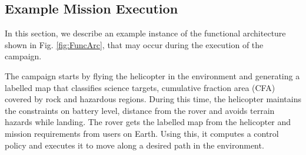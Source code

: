 \documentclass[conference]{IEEEtran}
\begin{document}
	\subsection{Example Mission Execution}
	\label{subsec:ExampleMissionExecution}
	In this section, we describe an example instance of the functional architecture shown in Fig. \ref{fig:FuncArc}, that may occur during the execution of the campaign. 
	
	The campaign starts by flying the helicopter in the environment and generating a labelled map that classifies science targets, cumulative fraction area (CFA) covered by rock and hazardous regions. During this time, the helicopter maintains the constraints on battery level, distance from the rover and avoids terrain hazards while landing. The rover gets the labelled map from the helicopter and mission requirements from users on Earth. Using this, it computes a control policy and executes it to move along a desired path in the environment.
	
\end{document}
